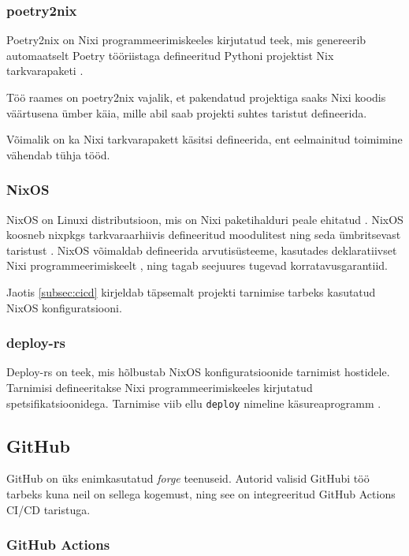 \subsubsection{poetry2nix}\label{subsubsec:poetry2nix}

Poetry2nix on Nixi programmeerimiskeeles kirjutatud teek, mis genereerib automaatselt Poetry tööriistaga defineeritud Pythoni projektist Nix tarkvarapaketi \cite{poetry2nix-repo}.

Töö raames on poetry2nix vajalik, et pakendatud projektiga saaks Nixi koodis väärtusena ümber käia, mille abil saab projekti suhtes taristut defineerida.

Võimalik on ka Nixi tarkvarapakett käsitsi defineerida, ent eelmainitud toimimine vähendab tühja tööd.

\subsubsection{NixOS}

NixOS on Linuxi distributsioon, mis on Nixi paketihalduri peale ehitatud \cite{nixos-manual-preface}. NixOS koosneb nixpkgs tarkvaraarhiivis defineeritud moodulitest ning seda ümbritsevast taristust \cite{nixos-manual-preface}. NixOS võimaldab defineerida arvutisüsteeme, kasutades deklaratiivset Nixi programmeerimiskeelt \cite{nixos-manual-configuration}, ning tagab seejuures tugevad korratavusgarantiid.

Jaotis \ref{subsec:cicd} kirjeldab täpsemalt projekti tarnimise tarbeks kasutatud NixOS konfiguratsiooni.

\subsubsection{deploy-rs}

Deploy-rs on teek, mis hõlbustab NixOS konfiguratsioonide tarnimist hostidele. Tarnimisi defineeritakse Nixi programmeerimiskeeles kirjutatud spetsifikatsioonidega. Tarnimise viib ellu \texttt{deploy} nimeline käsureaprogramm \cite{deploy-rs}.

\subsection{GitHub}

GitHub on üks enimkasutatud \emph{forge} teenuseid. Autorid valisid GitHubi töö tarbeks kuna neil on sellega kogemust, ning see on integreeritud GitHub Actions CI/CD taristuga.

\subsubsection{GitHub Actions}\label{subsubsec:github-actions}

